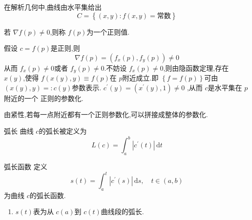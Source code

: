 \documentclass[../../古典微分几何.tex]{subfiles}
\begin{document}
\begin{example}
    在解析几何中,曲线由水平集给出 \[
    C =  \left\{ \left( x,y \right): f\left( x,y \right)= \text{常数}   \right\}
    \]
    \begin{definition}
        若 \(   \nabla f\left( p \right) \neq 0   \),则称 \(  f\left( p \right)   \)为一个正则值.  
    \end{definition}
假设   \(  c =  f\left( p \right)   \)是正则,则 \[
 \nabla f\left( p \right)= \left( f_{x}\left( p \right),f_{y}\left( p \right)   \right)\neq 0  
\]从而 \(  f_{x}\left( p \right)\neq 0   \)或者 \(  f_{y}\left( p \right)\neq 0   \).不妨设 \(  f_{x}\left( p \right)\neq 0   \),则由隐函数定理,存在
\(  x\left( y \right)   \),使得 \(  f\left( x\left( y \right),y  \right)\equiv f\left( p \right)    \)在 \(  p  \)附近成立.即 \(  \left\{ f = f\left( p \right)  \right\}  \)可由 \(  \left( x\left( y \right)  ,y\right) = : c\left( y \right)   \)参数表示.
 \(  c^{\prime} \left( y \right)= \left( x^{\prime} \left( y \right),1  \right)\neq 0    \)           ,从而 \(  c  \)是水平集在 \(  p  \)附近的一个 正则的参数化.
 
 \begin{remark}
    由紧性,若每一点附近都有一个正则参数化,可以拼接成整体的参数化.
 \end{remark} 
\end{example}

 
\hspace*{\fill} 

\begin{definition}{弧长}
    曲线 \(  c  \)的弧长被定义为 \[
    L\left( c \right)=  \int_{a}^{b} \left| c^{\prime} \left( t \right)  \right|\,\mathrm{d} t  
    \] 
\end{definition}

\begin{definition}{弧长函数}
    定义 \[
    s\left( t \right)= \int_{a}^{t} \left| c^{\prime} \left( s \right)  \right|\,\mathrm{d} s,\quad  t \in \left( a,b \right)   
    \]为曲线 \(  c  \)的弧长函数. 
\end{definition}

\begin{remark}
  \begin{enumerate}
    \item   \(  s\left( t \right)   \)表为从 \(  c\left( a \right)   \)到 \(  c\left( t \right)   \)曲线段的弧长.  

  \end{enumerate}
   
\end{remark}
\end{document}
